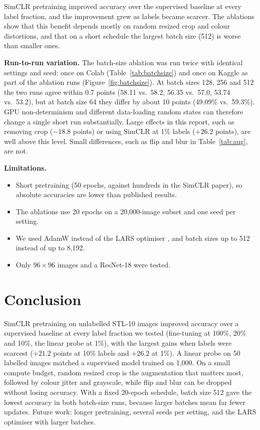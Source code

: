 \documentclass[twoside,a4paper,11pt]{article}
\begin{document}
SimCLR pretraining improved accuracy over the supervised baseline at every label
fraction, and the improvement grew as labels became scarcer. The ablations show that
this benefit depends mostly on random resized crop and colour distortions, and that on a
short schedule the largest batch size (512) is worse than smaller ones.

\textbf{Run-to-run variation.} The batch-size ablation was run twice with identical
settings and seed: once on Colab (Table~\ref{tab:batchsize}) and once on Kaggle as part
of the ablation runs (Figure~\ref{fig:batchsize}). At batch sizes 128, 256 and 512 the
two runs agree within 0.7 points (58.11 vs.\ 58.2, 56.35 vs.\ 57.0, 53.74 vs.\ 53.2),
but at batch size 64 they differ by about 10 points (49.09\% vs.\ 59.3\%). GPU
non-determinism and different data-loading random states can therefore change a single
short run substantially. Large effects in this report, such as removing crop
($-18.8$ points) or using SimCLR at 1\% labels ($+26.2$ points), are well above this
level. Small differences, such as flip and blur in Table~\ref{tab:aug}, are not.

\textbf{Limitations.}
\begin{itemize}
  \item Short pretraining (50 epochs, against hundreds in the SimCLR paper), so absolute
  accuracies are lower than published results.
  \item The ablations use 20 epochs on a 20,000-image subset and one seed per setting.
  \item We used AdamW instead of the LARS optimiser \cite{you2017lars}, and batch sizes up
  to 512 instead of up to 8,192.
  \item Only $96\times96$ images and a ResNet-18 were tested.
\end{itemize}

\section{Conclusion}
\label{sec:conclusion}

SimCLR pretraining on unlabelled STL-10 images improved accuracy over a supervised
baseline at every label fraction we tested (fine-tuning at 100\%, 20\% and 10\%, the
linear probe at 1\%), with the largest gains when labels were scarcest ($+21.2$ points at
10\% labels and $+26.2$ at 1\%). A linear probe on 50 labelled images matched a
supervised model trained on 1,000. On a small compute budget, random resized crop is the
augmentation that matters most, followed by colour jitter and grayscale, while flip and
blur can be dropped without losing accuracy. With a fixed 20-epoch schedule, batch size
512 gave the lowest accuracy in both batch-size runs, because larger batches mean far
fewer updates. Future work: longer pretraining, several seeds per setting, and the LARS
optimiser with larger batches.
\end{document}
